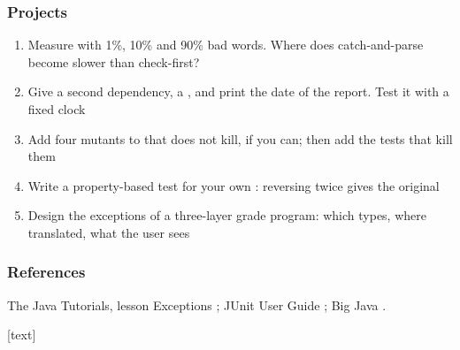 \documentclass[aspectratio=169,10pt,compress]{beamer}
\begin{document}
\begin{frame}[t,fragile] \frametitle{Projects}
	\begin{enumerate}\small
		\item Measure  with 1\%, 10\% and 90\% bad words. Where does catch-and-parse become slower than check-first?
		\item Give  a second dependency, a , and print the date of the report. Test it with a fixed clock
		\item Add four mutants to  that  does not kill, if you can; then add the tests that kill them
		\item Write a property-based test for your own : reversing twice gives the original
		\item Design the exceptions of a three-layer grade program: which types, where translated, what the user sees
	\end{enumerate}
\end{frame}




\begin{frame}[t,fragile] \frametitle{References}
	\small The Java Tutorials, lesson Exceptions \cite{TheJavaTutorials}; JUnit User Guide \cite{homeJunit}; Big Java \cite{horstmann2016big}.

	\vspace{1em}
	[text]
	
	\tiny
\end{frame}




\begin{frame}[t,fragile]
	\begin{center}
		\vspace{4cm}
	\end{center}
\end{frame}
\end{document}

